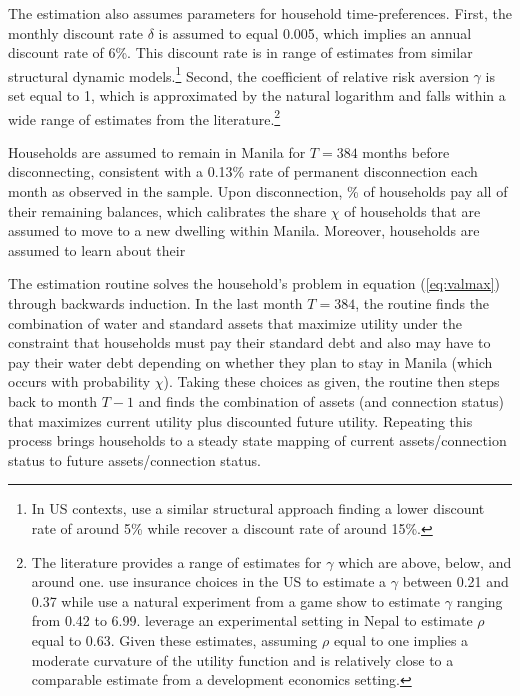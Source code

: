 \documentclass[12pt]{article}
\begin{document}
The estimation also assumes parameters for household time-preferences.  First, the monthly discount rate $\delta$ is assumed to equal 0.005, which implies an annual discount rate of 6\%. This discount rate is in range of estimates from similar structural dynamic models.\footnote{In US contexts,\cite{gourinchas2002consumption} use a similar structural approach finding a lower discount rate of around 5\% while \cite{laibson2007estimating} recover a discount rate of around 15\%.}  Second, the coefficient of relative risk aversion $\gamma$ is set equal to 1, which is approximated by the natural logarithm and falls within a wide range of estimates from the literature.\footnote{The literature provides a range of estimates for $\gamma$ which are above, below, and around one.  \cite{barseghyan2013nature} use insurance choices in the US to estimate a $\gamma$ between 0.21 and 0.37 while  \cite{beetsma2001measuring} use a natural experiment from a game show to estimate $\gamma$ ranging from 0.42 to 6.99.  \cite{carvalho2016effect} leverage an experimental setting in Nepal to estimate $\rho$ equal to 0.63.  Given these estimates, assuming $\rho$ equal to one implies a moderate curvature of the utility function and is relatively close to a comparable estimate from a development economics setting.}

Households are assumed to remain in Manila for $T=384$ months before disconnecting, consistent with a 0.13\% rate of permanent disconnection each month as observed in the sample.  Upon disconnection, \unskip\% of households pay all of their remaining balances, which calibrates the share $\chi$ of households that are assumed to move to a new dwelling within Manila.  Moreover, households are assumed to learn about their 




The estimation routine solves the household's problem in equation (\ref{eq:valmax}) through backwards induction.  In the last month $T=384$, the routine finds the combination of water and standard assets that maximize utility under the constraint that households must pay their standard debt and also may have to pay their water debt depending on whether they plan to stay in Manila (which occurs with probability $\chi$).  Taking these choices as given, the routine then steps back to month $T-1$ and finds the combination of assets (and connection status) that maximizes current utility plus discounted future utility.  Repeating this process brings households to a steady state mapping of current assets/connection status to future assets/connection status.  
\end{document}
